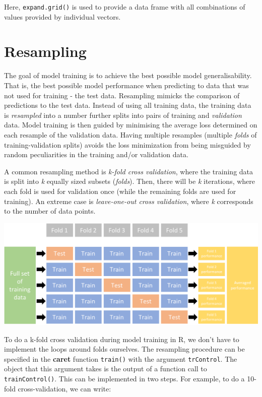 \documentclass[
]{book}
\begin{document}
Here, \texttt{expand.grid()} is used to provide a data frame with all combinations of values provided by individual vectors.

\hypertarget{resampling}{%
\section{Resampling}\label{resampling}}

The goal of model training is to achieve the best possible model generalisability. That is, the best possible model performance when predicting to data that was not used for training - the test data. Resampling mimicks the comparison of predictions to the test data. Instead of using all training data, the training data is \emph{resampled} into a number further splits into pairs of training and \emph{validation} data. Model training is then guided by minimising the average loss determined on each resample of the validation data. Having multiple resamples (multiple \emph{folds} of training-validation splits) avoids the loss minimization from being misguided by random peculiarities in the training and/or validation data.

A common resampling method is \emph{k-fold cross validation}, where the training data is split into \emph{k} equally sized subsets (\emph{folds}). Then, there will be \emph{k} iterations, where each fold is used for validation once (while the remaining folds are used for training). An extreme case is \emph{leave-one-out cross validation}, where \emph{k} corresponds to the number of data points.

\begin{center}\includegraphics[width=19.88in]{fig/cv} \end{center}

To do a k-fold cross validation during model training in R, we don't have to implement the loops around folds ourselves. The resampling procedure can be specified in the \textbf{caret} function \texttt{train()} with the argument \texttt{trControl}. The object that this argument takes is the output of a function call to \texttt{trainControl()}. This can be implemented in two steps. For example, to do a 10-fold cross-validation, we can write:
\end{document}
